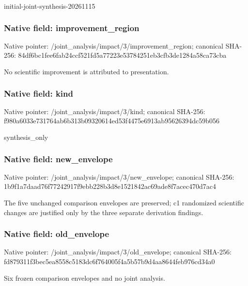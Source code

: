 \documentclass[10pt,a4paper]{article}
\begin{document}
\begingroup\raggedright\sloppy initial-joint-synthesis-20261115\par\endgroup

\subsubsection{Native field: improvement\_\allowbreak{}region}
Native pointer: /joint\_\allowbreak{}analysis/impact/3/improvement\_\allowbreak{}region; canonical SHA-256: 84df6bc1fee6fab24ccf521fd5a77223e53784251eb3cfb3de1284a58ca73cba

\begingroup\raggedright\sloppy No scientific improvement is attributed to presentation.\par\endgroup

\subsubsection{Native field: kind}
Native pointer: /joint\_\allowbreak{}analysis/impact/3/kind; canonical SHA-256: f980a6033e731764ab6b313b09320614ed53f4475e6913ab95626394dc59b056

\begingroup\raggedright\sloppy synthesis\_\allowbreak{}only\par\endgroup

\subsubsection{Native field: new\_\allowbreak{}envelope}
Native pointer: /joint\_\allowbreak{}analysis/impact/3/new\_\allowbreak{}envelope; canonical SHA-256: 1b9f1a7daad76f77242917f9ebb228b3d8e1521842ac69ade8f7acec470d7ac4

\begingroup\raggedright\sloppy The five unchanged comparison envelopes are preserved;\allowbreak{} c1 randomized scientific changes are justified only by the three separate derivation findings.\par\endgroup

\subsubsection{Native field: old\_\allowbreak{}envelope}
Native pointer: /joint\_\allowbreak{}analysis/impact/3/old\_\allowbreak{}envelope; canonical SHA-256: fd879311f3bec5ea8558c5183dc6f764005f4a5b57b9d4aa8644feb976cd34a0

\begingroup\raggedright\sloppy Six frozen comparison envelopes and no joint analysis.\par\endgroup
\end{document}
